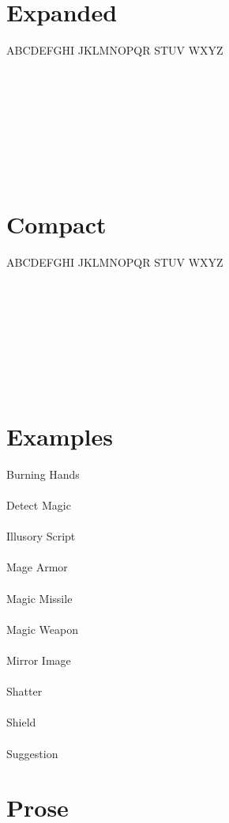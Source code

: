 \documentclass[letterpaper]{article}
\begin{document}
\section*{Expanded}

{
    \Large \wizpenfont \noindent \lsstyle
    ABCDEFGHI JKLMNOPQR STUV WXYZ \\ \\
}
{
    \Large \noindent
     \\ \\
}

{
    \Large \wizpenfont \noindent {} \\ \\
}
{
    \Large \noindent
     \\ \\
}

\section*{Compact}

{
    \Large \wizpenfont \noindent
    ABCDEFGHI JKLMNOPQR STUV WXYZ \\ \\
}
{
    \Large \noindent
     \\ \\
}

{
    \Large \wizpenfont {} \\ \\
}
{
    \Large \noindent
     \\ \\
}

\clearpage

\section*{Examples}

{
    \Large \wizpenfont \noindent %
    Burning Hands \\ \\
    Detect Magic \\ \\
    Illusory Script \\ \\
    Mage Armor \\ \\
    Magic Missile \\ \\
    Magic Weapon \\ \\
    Mirror Image \\ \\
    Shatter \\ \\
    Shield \\ \\
    Suggestion \\
}

\clearpage

\section*{Prose}

{
    \Large \wizpenfont \noindent %
    \begin{sloppypar}
        \blindtext
    \end{sloppypar}
}
\end{document}
